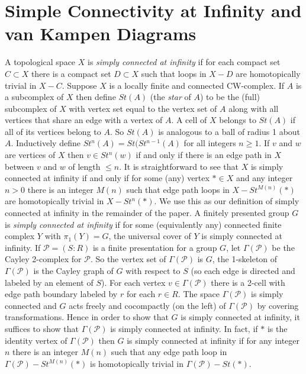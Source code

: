 \documentclass[12pt]{article}
\numberwithin{equation}{section}
\begin{document}
\section{Simple Connectivity at Infinity and van Kampen Diagrams} \label{SCIVK}
 A topological space $X$ is {\it simply connected at infinity} if for each compact set $C\subset X$ there is a compact set $D\subset X$ such that loops in $X-D$ are homotopically trivial in $X-C$. Suppose $X$ is a locally finite and connected CW-complex. If $A$ is a subcomplex of $X$ then define $St(A)$ (the {\it star} of $A$) to be the (full) subcomplex of $X$ with vertex set equal to the vertex set of $A$ along with all vertices that share an edge with a vertex of $A$. A cell of $X$ belongs to $St(A)$ if all of its vertices belong to $A$. So $St(A)$ is analogous to a ball of radius 1 about $A$. Inductively define $St^n(A)=St(St^{n-1}(A)$ for all integers $n\geq 1$. If $v$ and $w$ are vertices of $X$ then $v\in St^n(w)$ if and only if there is an edge path in $X$ between $v$ and $w$ of length $\leq n$. It is straightforward to see that $X$ is simply connected at infinity if and only if for some (any) vertex $\ast\in X$ and any integer $n>0$ there is an integer $M(n)$ such that edge path loops in $X-St^{M(n)}(\ast)$ are homotopically trivial in $X-St^n(\ast)$. We use this as our definition of simply connected at infinity in the remainder of the paper. A finitely presented group $G$ is {\it simply connected at infinity} if for some (equivalently any) connected finite complex $Y$ with $\pi_1(Y)=G$, the universal cover of $Y$ is simply connected at infinity. 
 If $\mathcal P=(S:R)$ is a finite presentation for a group $G$, let $\Gamma(\mathcal P)$ be the Cayley 2-complex for $\mathcal P$. So the vertex set of $\Gamma(\mathcal P)$ is $G$, the 1-skeleton of $\Gamma(\mathcal P)$ is the Cayley graph of $G$ with respect to $S$ (so each edge is directed and labeled by an element of $S$). For each vertex $v\in \Gamma(\mathcal P)$ there is a 2-cell with edge path boundary labeled by $r$ for each $r\in R$. The space $\Gamma(\mathcal P)$ is simply connected and $G$ acts freely and cocompactly (on the left) of $\Gamma(\mathcal P)$ by covering transformations. Hence in order to show that $G$ is simply connected at infinity, it suffices to show that $\Gamma(\mathcal P)$ is simply connected at infinity. In fact, if $\ast$ is the identity vertex of $\Gamma(\mathcal P)$ then $G$ is simply connected at infinity if for any integer $n$ there is an integer $M(n)$ such that any edge path loop in $\Gamma(\mathcal P)-St^{M(n)}(\ast)$ is homotopically trivial in $\Gamma(\mathcal P)-St(\ast)$.
 
\end{document}
